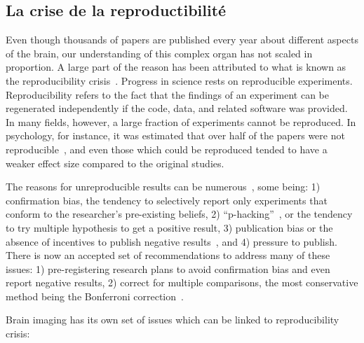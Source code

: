 \subsection*{La crise de la reproductibilité}
\label{sec:sommaire:reproducibility_crisis}
Even though thousands of papers are published every year about different aspects of the brain, our understanding of this complex organ has not scaled in proportion. A large part of the reason has been attributed to what is known as the reproducibility crisis~\citep{ioannidis2005most, simmons2011false, button2013power}. %
Progress in science rests on reproducible experiments. Reproducibility refers to the fact that the findings of an experiment can be regenerated independently if the code, data, and related software was provided. In many fields, however, a large fraction of experiments cannot be reproduced. In psychology, for instance, it was estimated that over half of the papers were not reproducible~\citep{open2015estimating}, and even those which could be reproduced tended to have a weaker effect size compared to the original studies. 

The reasons for unreproducible results can be numerous~\citep{baker20161}, some being: 1) confirmation bias, the tendency to selectively report only experiments that conform to the researcher's pre-existing beliefs, 2) ``p-hacking''~\citep{simmons2011false}, or the tendency to try multiple hypothesis to get a positive result, 3) publication bias or the absence of incentives to publish negative results~\citep{rosenthal1979file}, and 4) pressure to publish. There is now an accepted set of recommendations to address many of these issues: 1) pre-registering research plans to avoid confirmation bias and even report negative results, 2) correct for multiple comparisons, the most conservative method being the Bonferroni correction~\citep{dunn1961multiple}. 

Brain imaging has its own set of issues which can be linked to reproducibility crisis: 


